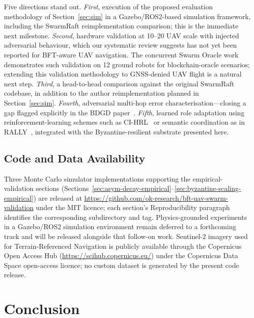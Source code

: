 \documentclass[conference,10pt]{IEEEtran}
\begin{document}
Five directions stand out. \emph{First}, execution of the proposed evaluation methodology of Section~\ref{sec:sim} in a Gazebo/ROS2-based simulation framework, including the SwarmRaft reimplementation comparison; this is the immediate next milestone. \emph{Second}, hardware validation at 10--20 UAV scale with injected adversarial behaviour, which our systematic review suggests has not yet been reported for BFT-aware UAV navigation. The concurrent Swarm Oracle work~\cite{pacheco2025swarmoracle} demonstrates such validation on 12 ground robots for blockchain-oracle scenarios; extending this validation methodology to GNSS-denied UAV flight is a natural next step. \emph{Third}, a head-to-head comparison against the original SwarmRaft~\cite{dev2025swarmraft} codebase, in addition to the author reimplementation planned in Section~\ref{sec:sim}. \emph{Fourth}, adversarial multi-hop error characterisation---closing a gap flagged explicitly in the BDGD paper~\cite{zhong2025bdgd}. \emph{Fifth}, learned role adaptation using reinforcement-learning schemes such as CI-HRL~\cite{xiang2025cihrl} or semantic coordination as in RALLY~\cite{wang2025rally}, integrated with the Byzantine-resilient substrate presented here.

\subsection*{Code and Data Availability}
Three Monte Carlo simulator implementations supporting the empirical-validation sections (Sections~\ref{sec:asym-decay-empirical}--\ref{sec:byzantine-scaling-empirical}) are released at \url{https://github.com/ok-research/bft-uav-swarm-validation} under the MIT licence; each section's Reproducibility paragraph identifies the corresponding subdirectory and tag. Physics-grounded experiments in a Gazebo/ROS2 simulation environment remain deferred to a forthcoming track and will be released alongside that follow-on work. Sentinel-2 imagery used for Terrain-Referenced Navigation is publicly available through the Copernicus Open Access Hub (\url{https://scihub.copernicus.eu/}) under the Copernicus Data Space open-access licence; no custom dataset is generated by the present code release.

\section{Conclusion}
\label{sec:conclusion}
\end{document}
